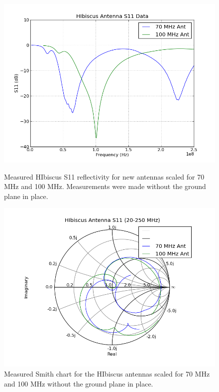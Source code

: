 \begin{figure}[htb]
\centering
\begin{minipage}[b]{0.50\textwidth}
\centering
\includegraphics[width=0.95\linewidth]{SCIHI_system/figures/HIbiscus_S11_dB_both.png}
\caption{Measured HIbiscus S11 reflectivity for new antennas scaled for 70 MHz and 100 MHz. Measurements were made without the ground plane in place. }
\label{Fig:HIS11_dB}
\end{minipage}%
\begin{minipage}[b]{0.02\textwidth}
\hspace{1cm}
\end{minipage}%
\begin{minipage}[b]{0.46\textwidth}
\centering
\includegraphics[width=0.95\linewidth]{SCIHI_system/figures/HIbiscus_S11_Smith_both.png}
\caption{Measured Smith chart for the HIbiscus antennas scaled for 70 MHz and 100 MHz without the ground plane in place.}
\label{Fig:HIS11_Smith}
\end{minipage}
\end{figure}

